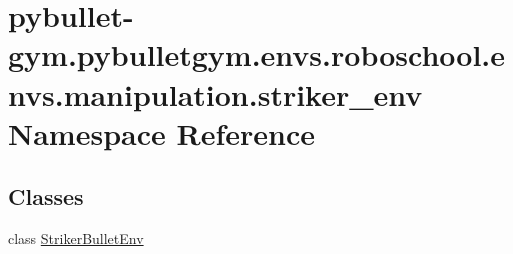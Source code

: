 \hypertarget{namespacepybullet-gym_1_1pybulletgym_1_1envs_1_1roboschool_1_1envs_1_1manipulation_1_1striker__env}{}\section{pybullet-\/gym.pybulletgym.\+envs.\+roboschool.\+envs.\+manipulation.\+striker\+\_\+env Namespace Reference}
\label{namespacepybullet-gym_1_1pybulletgym_1_1envs_1_1roboschool_1_1envs_1_1manipulation_1_1striker__env}
\subsection*{Classes}
\begin{DoxyCompactItemize}
\item 
class \hyperlink{classpybullet-gym_1_1pybulletgym_1_1envs_1_1roboschool_1_1envs_1_1manipulation_1_1striker__env_1_1_striker_bullet_env}{Striker\+Bullet\+Env}
\end{DoxyCompactItemize}
